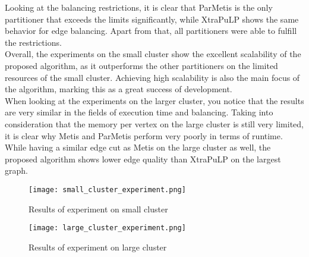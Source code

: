 \documentclass[acmsmall,nonacm,screen,review]{acmart}
\begin{document}
Looking at the balancing restrictions, it is clear that ParMetis is the only partitioner that exceeds the limits significantly, while XtraPuLP shows the same behavior for edge balancing. Apart from that, all partitioners were able to fulfill the restrictions. \\
Overall, the experiments on the small cluster show the excellent scalability of the proposed algorithm, as it outperforms the other partitioners on the limited resources of the small cluster. Achieving high scalability is also the main focus of the algorithm, marking this as a great success of development. \\
When looking at the experiments on the larger cluster, you notice that the results are very similar in the fields of execution time and balancing. Taking into consideration that the memory per vertex on the large cluster is still very limited, it is clear why Metis and ParMetis perform very poorly in terms of runtime. While having a similar edge cut as Metis on the large cluster as well, the proposed algorithm shows lower edge quality than XtraPuLP on the largest graph.
\begin{figure}[t]
\centering
\caption{Results of experiment on small cluster}
\label{small_ex}
\texttt{[image: small\_cluster\_experiment.png]}
\end{figure}
\begin{figure}[t]
\centering
\caption{Results of experiment on large cluster}
\label{large_ex}
\texttt{[image: large\_cluster\_experiment.png]}
\end{figure}
\end{document}
